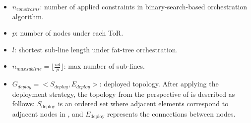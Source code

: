 \begin{itemize}
{    }
    \item{
        $n_{constrains}$: number of applied constraints in binary-search-based orchestration algorithm.
    }
    \item{
        $p$: number of nodes under each ToR.
    }
    \item{
        $l$: shortest sub-line length under fat-tree orchestration.
    }
    \item{
        $n_{maxsubline}=\lfloor \frac{nd}{p} \rfloor$: max number of sub-lines.
    }
    \item{
        $G_{deploy}=<S_{deploy},E_{deploy}>$: deployed topology. After applying the deployment strategy, the topology from the perspective of \SYS{} is described as follows: $S_{\text{deploy}}$ is an ordered set where adjacent elements correspond to adjacent nodes in \SYS{}, and $E_{\text{deploy}}$ represents the connections between nodes.
    }
    
\end{itemize}






